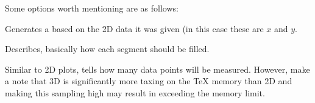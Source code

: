 \documentclass[minted, draw]{../tex/hebdomon}
\begin{document}
Some options worth mentioning are as follows:

\begin{hgitemize}
	\item[\pcode{surf}] Generates a  based on the 2D
	data it was given (in this case these are $x$ and $y$.
	\item[\pcode{shader}] Describes, basically how each segment should be
	filled.
	\item[\pcode{samples}] Similar to 2D plots, tells how many data points will
	be measured. However, make a note that 3D is significantly more taxing
	on the TeX memory than 2D and making this sampling high may result in
	exceeding the memory limit.
\end{hgitemize}
\end{document}

